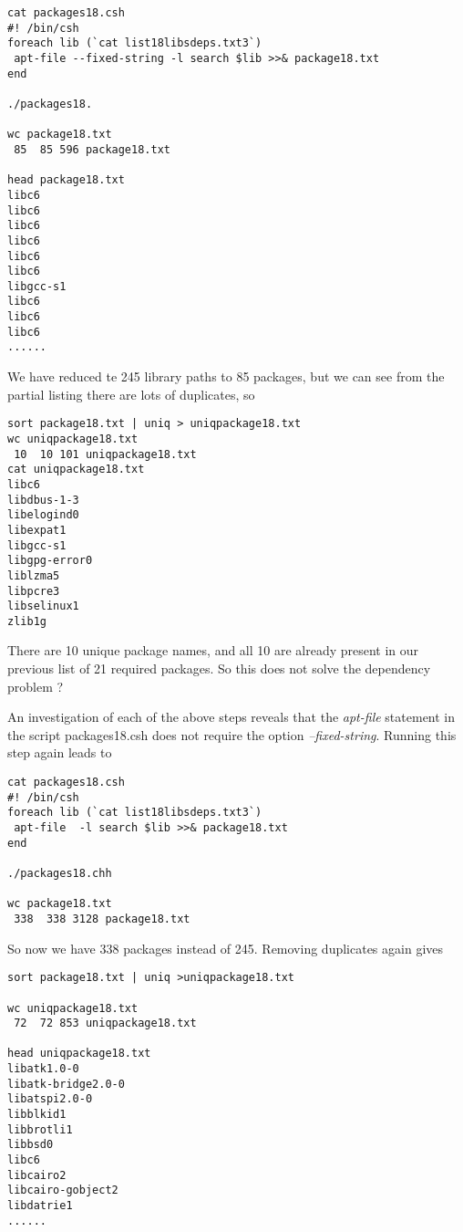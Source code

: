 \documentclass[a4paper]{article}  %
\begin{document}
\begin{tcolorbox}
\begin{verbatim}
cat packages18.csh
#! /bin/csh
foreach lib (`cat list18libsdeps.txt3`)
 apt-file --fixed-string -l search $lib >>& package18.txt
end

./packages18.

wc package18.txt
 85  85 596 package18.txt

head package18.txt
libc6
libc6
libc6
libc6
libc6
libc6
libgcc-s1
libc6
libc6
libc6
......
\end{verbatim}
\end{tcolorbox}
We have reduced te 245 library paths to 85 packages, but we can see from the partial listing there are lots of duplicates, so
\begin{tcolorbox}
\begin{verbatim}
sort package18.txt | uniq > uniqpackage18.txt
wc uniqpackage18.txt
 10  10 101 uniqpackage18.txt
cat uniqpackage18.txt
libc6
libdbus-1-3
libelogind0
libexpat1
libgcc-s1
libgpg-error0
liblzma5
libpcre3
libselinux1
zlib1g
\end{verbatim}
\end{tcolorbox}
 There are 10 unique package names, and all 10 are already present in our previous list of 21 required packages.  So this does not solve the dependency problem ?

An investigation of each of the above steps reveals that the {\em apt-file} statement in the script packages18.csh does not require the option {\em --fixed-string}. Running this step again leads to

\begin{tcolorbox}
\begin{verbatim}
cat packages18.csh
#! /bin/csh
foreach lib (`cat list18libsdeps.txt3`)
 apt-file  -l search $lib >>& package18.txt
end

./packages18.chh

wc package18.txt
 338  338 3128 package18.txt

\end{verbatim}
\end{tcolorbox}
So now we have 338 packages instead of 245. Removing duplicates again gives
\begin{tcolorbox}
\begin{verbatim}
sort package18.txt | uniq >uniqpackage18.txt

wc uniqpackage18.txt
 72  72 853 uniqpackage18.txt

head uniqpackage18.txt
libatk1.0-0
libatk-bridge2.0-0
libatspi2.0-0
libblkid1
libbrotli1
libbsd0
libc6
libcairo2
libcairo-gobject2
libdatrie1
......
\end{verbatim}
\end{tcolorbox}
\end{document}
